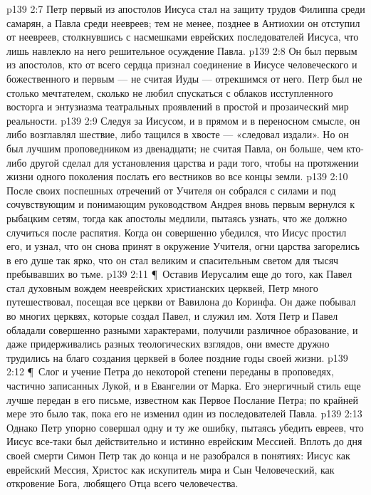 \vs p139 2:7 Петр первый из апостолов Иисуса стал на защиту трудов Филиппа среди самарян, а Павла среди неевреев; тем не менее, позднее в Антиохии он отступил от неевреев, столкнувшись с насмешками еврейских последователей Иисуса, что лишь навлекло на него решительное осуждение Павла.
\vs p139 2:8 Он был первым из апостолов, кто от всего сердца признал соединение в Иисусе человеческого и божественного и первым --- не считая Иуды --- отрекшимся от него. Петр был не столько мечтателем, сколько не любил спускаться с облаков исступленного восторга и энтузиазма театральных проявлений в простой и прозаический мир реальности.
\vs p139 2:9 Следуя за Иисусом, и в прямом и в переносном смысле, он либо возглавлял шествие, либо тащился в хвосте --- «следовал издали». Но он был лучшим проповедником из двенадцати; не считая Павла, он больше, чем кто\hyp{}либо другой сделал для установления царства и ради того, чтобы на протяжении жизни одного поколения послать его вестников во все концы земли.
\vs p139 2:10 После своих поспешных отречений от Учителя он собрался с силами и под сочувствующим и понимающим руководством Андрея вновь первым вернулся к рыбацким сетям, тогда как апостолы медлили, пытаясь узнать, что же должно случиться после распятия. Когда он совершенно убедился, что Иисус простил его, и узнал, что он снова принят в окружение Учителя, огни царства загорелись в его душе так ярко, что он стал великим и спасительным светом для тысяч пребывавших во тьме.
\vs p139 2:11 \P\ Оставив Иерусалим еще до того, как Павел стал духовным вождем нееврейских христианских церквей, Петр много путешествовал, посещая все церкви от Вавилона до Коринфа. Он даже побывал во многих церквях, которые создал Павел, и служил им. Хотя Петр и Павел обладали совершенно разными характерами, получили различное образование, и даже придерживались разных теологических взглядов, они вместе дружно трудились на благо создания церквей в более поздние годы своей жизни.
\vs p139 2:12 \P\ Слог и учение Петра до некоторой степени переданы в проповедях, частично записанных Лукой, и в Евангелии от Марка. Его энергичный стиль еще лучше передан в его письме, известном как Первое Послание Петра; по крайней мере это было так, пока его не изменил один из последователей Павла.
\vs p139 2:13 Однако Петр упорно совершал одну и ту же ошибку, пытаясь убедить евреев, что Иисус все\hyp{}таки был действительно и истинно еврейским Мессией. Вплоть до дня своей смерти Симон Петр так до конца и не разобрался в понятиях: Иисус как еврейский Мессия, Христос как искупитель мира и Сын Человеческий, как откровение Бога, любящего Отца всего человечества.
